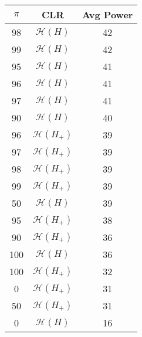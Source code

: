 \centering \begin{tabular}{c|c|c}
$\pi$	&CLR	&Avg Power\\\hline
98	&$\mathcal{H}(H)$	&42\\
99	&$\mathcal{H}(H)$	&42\\
95	&$\mathcal{H}(H)$	&41\\
96	&$\mathcal{H}(H)$	&41\\
97	&$\mathcal{H}(H)$	&41\\
90	&$\mathcal{H}(H)$	&40\\
96	&$\mathcal{H}(H_+)$	&39\\
97	&$\mathcal{H}(H_+)$	&39\\
98	&$\mathcal{H}(H_+)$	&39\\
99	&$\mathcal{H}(H_+)$	&39\\
50	&$\mathcal{H}(H)$	&39\\
95	&$\mathcal{H}(H_+)$	&38\\
90	&$\mathcal{H}(H_+)$	&36\\
100	&$\mathcal{H}(H)$	&36\\
100	&$\mathcal{H}(H_+)$	&32\\
0	&$\mathcal{H}(H_+)$	&31\\
50	&$\mathcal{H}(H_+)$	&31\\
0	&$\mathcal{H}(H)$	&16\\
\end{tabular}
